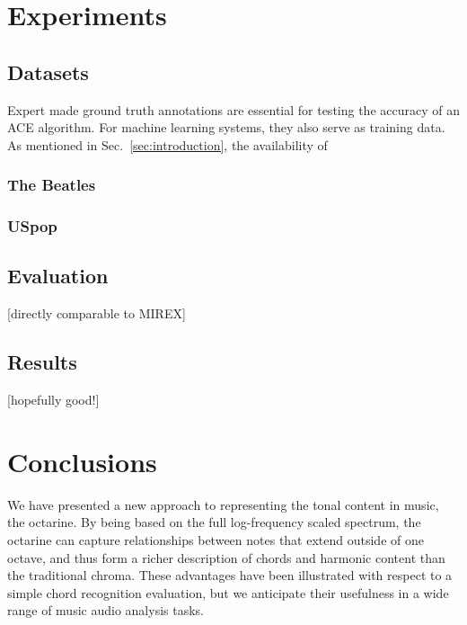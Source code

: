 \documentclass{article}
\begin{document}
\section{Experiments}\label{sec:exp}
\subsection{Datasets}\label{sub:data}
Expert made ground truth annotations are essential for testing the accuracy of an ACE algorithm. For machine learning systems, they also serve as training data. As mentioned in Sec.~\ref{sec:introduction}, the availability of 
\subsubsection{The Beatles}

\subsubsection{USpop}

\subsection{Evaluation}\label{sub:eval}
[directly comparable to MIREX]

\subsection{Results}\label{sub:results}
[hopefully good!]

\section{Conclusions}\label{sec:conclus}

We have presented a new approach to representing the tonal content in music, 
the octarine.  By being based on the full log-frequency scaled spectrum, the 
octarine can capture relationships between notes that extend outside of one 
octave, and thus form a richer description of chords and harmonic content than 
the traditional chroma.  These advantages have been illustrated with respect to 
a simple chord recognition evaluation, but we anticipate their usefulness in a wide 
range of music audio analysis tasks.


\end{document}
